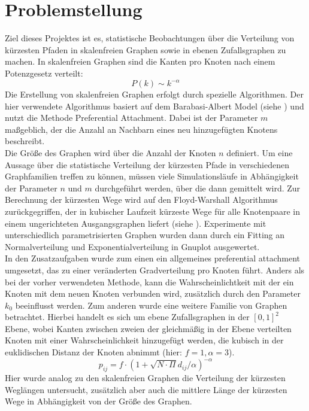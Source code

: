\documentclass[10pt]{article}
\begin{document}
\lstset{
	language=C,
	basicstyle=\footnotesize,
	frame=tb,
	xleftmargin=.2\textwidth,
	xrightmargin=.2\textwidth
}
\onehalfspacing

\tableofcontents
\newpage
\section{Problemstellung}
 
Ziel dieses Projektes ist es, statistische Beobachtungen über die Verteilung von kürzesten Pfaden in skalenfreien Graphen sowie in ebenen Zufallsgraphen zu machen. In skalenfreien Graphen sind die Kanten pro Knoten nach einem Potenzgesetz verteilt: 
\begin{equation*}
P(k) \sim k^{-\alpha}
\end{equation*}
Die Erstellung von skalenfreien Graphen erfolgt durch spezielle Algorithmen. Der hier verwendete Algorithmus basiert auf dem Barabasi-Albert Model (siehe \cite{Barabasi}) und nutzt die Methode Preferential Attachment. Dabei ist der Parameter $m$ maßgeblich, der die Anzahl an Nachbarn eines neu hinzugefügten Knotens beschreibt. \\

Die Größe des Graphen wird über die Anzahl der Knoten $n$ definiert. Um eine Aussage über die statistische Verteilung der kürzesten Pfade in verschiedenen Graphfamilien treffen zu können, müssen viele Simulationsläufe in Abhängigkeit der Parameter $n$ und $m$ durchgeführt werden, über die dann gemittelt wird.
Zur Berechnung der kürzesten Wege wird auf den Floyd-Warshall Algorithmus zurückgegriffen, der in kubischer Laufzeit kürzeste Wege für alle Knotenpaare in einem ungerichteten Ausgangsgraphen liefert (siehe \cite{Floyd}).
Experimente mit unterschiedlich parametrisierten Graphen wurden dann durch ein Fitting an Normalverteilung und Exponentialverteilung in Gnuplot ausgewertet.\\

In den Zusatzaufgaben wurde zum einen ein allgemeines preferential attachment umgesetzt, das zu einer veränderten Gradverteilung pro Knoten führt. Anders als bei der vorher verwendeten Methode, kann die Wahrscheinlichtkeit mit der ein Knoten mit dem neuen Knoten verbunden wird, zusätzlich durch den Parameter $k_0$ beeinflusst werden.
Zum anderen wurde eine weitere Familie von Graphen betrachtet. Hierbei handelt es sich um ebene Zufallsgraphen in der $[0,1]^2$ Ebene, wobei Kanten zwischen zweien der gleichmäßig in der Ebene verteilten Knoten mit einer Wahrscheinlichkeit hinzugefügt werden, die kubisch in der euklidischen Distanz der Knoten abnimmt (hier: $f=1, \alpha=3$). 
\begin{equation*}
p_{ij} = f \cdot (1+\sqrt{N \cdot \Pi}d_{ij}/\alpha)^{-\alpha}
\end{equation*}
Hier wurde analog zu den skalenfreien Graphen die Verteilung der kürzesten Weglängen untersucht, zusätzlich aber auch die mittlere Länge der kürzesten Wege in Abhängigkeit von der Größe des Graphen.
\end{document}
